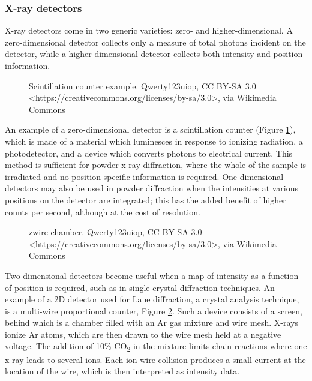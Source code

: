 \subsubsection{X-ray detectors}
X-ray detectors come in two generic varieties: zero- and higher-dimensional. A zero-dimensional detector collects only a measure of total photons incident on the detector, while a higher-dimensional detector collects both intensity and position information.
\begin{figure}[htbp]
  \centering
  
  \caption{Scintillation counter example. Qwerty123uiop, CC BY-SA 3.0 <https://creativecommons.org/licenses/by-sa/3.0>, via Wikimedia Commons}
  \label{scintillationcounter}
\end{figure}

An example of a zero-dimensional detector is a scintillation counter (Figure \ref{scintillationcounter}), which is made of a material which luminesces in response to ionizing radiation, a photodetector, and a device which converts photons to electrical current. This method is sufficient for powder x-ray diffraction, where the whole of the sample is irradiated and no position-specific information is required. One-dimensional detectors may also be used in powder diffraction when the intensities at various positions on the detector are integrated; this has the added benefit of higher counts per second, although at the cost of resolution.
\begin{figure}[htbp]
  \centering
  
  \caption{zwire chamber. Qwerty123uiop, CC BY-SA 3.0 <https://creativecommons.org/licenses/by-sa/3.0>, via Wikimedia Commons}
  \label{wirechamber}
\end{figure}

Two-dimensional detectors become useful when a map of intensity as a function of position is required, such as in single crystal diffraction techniques. An example of a 2D detector used for Laue diffraction, a crystal analysis technique, is a multi-wire proportional counter, Figure \ref{wirechamber}. Such a device consists of a screen, behind which is a chamber filled with an Ar gas mixture and wire mesh. X-rays ionize Ar atoms, which are then drawn to the wire mesh held at a negative voltage. The addition of 10\% CO\textsubscript{2} in the mixture limits chain reactions where one x-ray leads to several ions. Each ion-wire collision produces a small current at the location of the wire, which is then interpreted as intensity data.
  
